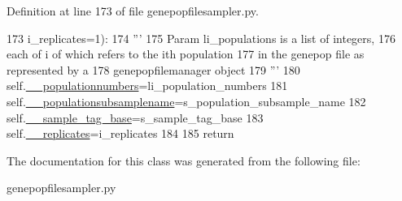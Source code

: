 Definition at line 173 of file genepopfilesampler.\+py.


\begin{DoxyCode}
173                 i\_replicates=1):
174         \textcolor{stringliteral}{'''}
175 \textcolor{stringliteral}{        Param li\_populations is a list of integers,}
176 \textcolor{stringliteral}{        each of i of which refers to the ith population}
177 \textcolor{stringliteral}{        in the genepop file as represented by a }
178 \textcolor{stringliteral}{        genepopfilemanager object}
179 \textcolor{stringliteral}{        '''}
180         self.\hyperlink{classnegui_1_1genepopfilesampler_1_1GenepopFileSampleParams_a48dfd2df4eb75dbacdc8a274cd3323ad}{\_\_populationnumbers}=li\_population\_numbers
181         self.\hyperlink{classnegui_1_1genepopfilesampler_1_1GenepopFileSampleParams_ae03531d2c9d450d7f717816a06f3a08a}{\_\_populationsubsamplename}=s\_population\_subsample\_name
182         self.\hyperlink{classnegui_1_1genepopfilesampler_1_1GenepopFileSampleParams_a4193649748e4c6da4b84ce8c0c994b47}{\_\_sample\_tag\_base}=s\_sample\_tag\_base
183         self.\hyperlink{classnegui_1_1genepopfilesampler_1_1GenepopFileSampleParams_aa16473f580e2f263162f643b6278fb19}{\_\_replicates}=i\_replicates
184 
185         \textcolor{keywordflow}{return}
\end{DoxyCode}


The documentation for this class was generated from the following file\+:\begin{DoxyCompactItemize}
\item 
genepopfilesampler.\+py\end{DoxyCompactItemize}
